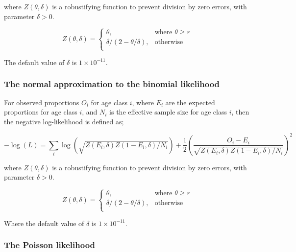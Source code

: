 where $Z \left(\theta,\delta \right)$ is a robustifying function to prevent division by zero errors, with parameter $\delta>0$.

\begin{equation}
	Z \left(\theta,\delta \right) = \begin{cases}
	\theta, & \text{where $\theta \ge r$} \\
	\delta/\left( 2-\theta/\delta \right), & \text{otherwise} \\
	\end{cases}
\end{equation}

The default value of $\delta$ is $1 \times 10^{-11}$.

\subsubsection{The normal approximation to the binomial likelihood}

For observed proportions $O_i$ for age class $i$, where $E_i$ are the expected proportions for age class $i$, and $N_i$ is the effective sample size for age class $i$, then the negative log-likelihood is defined as;

\begin{equation}
	-\log \left(L \right)= \sum\limits_i \log \left( \sqrt{Z\left(E_i,\delta \right)Z\left(1-E_i,\delta\right)/N_i} \right) + \frac{1}{2} \left( \frac{O_i-E_i}{\sqrt{Z\left(E_i,\delta\right)Z\left(1-E_i,\delta \right)/N_i}} \right)^2
\end{equation}

where $Z \left(\theta,\delta \right)$ is a robustifying function to prevent division by zero errors, with parameter $\delta>0$.

\begin{equation}
	Z \left(\theta,\delta \right) = \begin{cases}
	\theta, & \text{where $\theta \ge r$} \\
	\delta/\left( 2-\theta/\delta \right), & \text{otherwise} \\
	\end{cases}
\end{equation}

Where the default value of $\delta$ is $1 \times 10^{-11}$.


\subsubsection{The Poisson likelihood}

